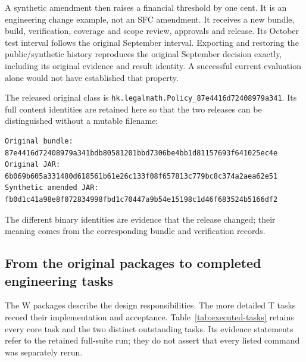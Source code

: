 A synthetic amendment then raises a financial threshold by one cent. It is an
engineering change example, not an SFC amendment. It receives a new bundle,
build, verification, coverage and scope review, approvals and release. Its
October test interval follows the original September interval. Exporting and
restoring the public/synthetic history reproduces the original September
decision exactly, including its original evidence and result identity. A
successful current evaluation alone would not have established that property.


The released original class is
\texttt{hk.legalmath.Policy\_87e4416d72408979a341}. Its full content identities
are retained here so that the two releases can be distinguished without a
mutable filename:
\begin{lstlisting}[caption={SHA-256 identities of the retained local walkthrough.}]
Original bundle:
87e4416d72408979a341bdb80581201bbd7306be4bb1d81157693f641025ec4e
Original JAR:
6b069b605a331480d618561b61e26c133f08f657813c779bc8c374a2aea62e51
Synthetic amended JAR:
fb0d1c41a98e8f072834998fbd1c70447a9b54e15198c1d46f683524b5166df2
\end{lstlisting}
The different binary identities are evidence that the release changed; their
meaning comes from the corresponding bundle and verification records.

\subsection{From the original packages to completed engineering tasks}

The W packages describe the design responsibilities. The more detailed T tasks
record their implementation and acceptance. Table~\ref{tab:executed-tasks}
retains every core task and the two distinct outstanding tasks. Its evidence
statements refer to the retained full-suite run; they do not assert that every
listed command was separately rerun.

